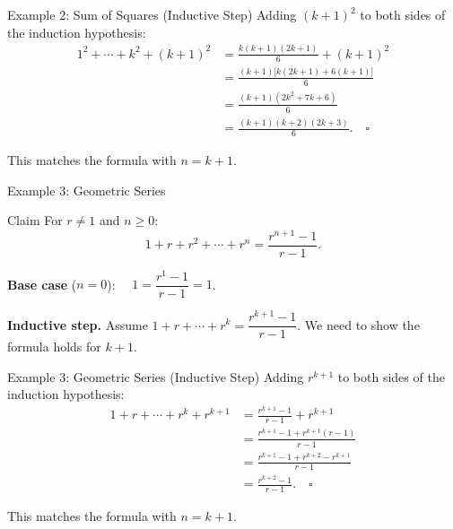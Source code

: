 \documentclass[10pt,aspectratio=169]{beamer}
\begin{document}
\begin{frame}{Example 2: Sum of Squares (Inductive Step)}
  Adding $(k+1)^2$ to both sides of the induction hypothesis:
  \begin{align*}
    1^2 + \cdots + k^2 + (k+1)^2
    &= \frac{k(k+1)(2k+1)}{6} + (k+1)^2 \\[0.4em]
    &= \frac{(k+1)\bigl[k(2k+1) + 6(k+1)\bigr]}{6} \\[0.4em]
    &= \frac{(k+1)(2k^2 + 7k + 6)}{6} \\[0.4em]
    &= \frac{(k+1)(k+2)(2k+3)}{6}. \quad \square
  \end{align*}

  \bigskip
  \begin{center}
    This matches the formula with $n = k+1$.
  \end{center}
\end{frame}

\begin{frame}{Example 3: Geometric Series}
  \begin{block}{Claim}
    For $r \ne 1$ and $n \ge 0$:
    \[
      1 + r + r^2 + \cdots + r^n = \frac{r^{n+1} - 1}{r - 1}.
    \]
  \end{block}

  \bigskip
  \textbf{Base case} ($n = 0$): $\quad 1 = \dfrac{r^1 - 1}{r - 1} = 1$.

  \bigskip
  \textbf{Inductive step.} Assume $1 + r + \cdots + r^k = \dfrac{r^{k+1}-1}{r-1}$.
  We need to show the formula holds for $k+1$.
\end{frame}

\begin{frame}{Example 3: Geometric Series (Inductive Step)}
  Adding $r^{k+1}$ to both sides of the induction hypothesis:
  \begin{align*}
    1 + r + \cdots + r^k + r^{k+1}
    &= \frac{r^{k+1} - 1}{r - 1} + r^{k+1} \\[0.5em]
    &= \frac{r^{k+1} - 1 + r^{k+1}(r - 1)}{r - 1} \\[0.5em]
    &= \frac{r^{k+1} - 1 + r^{k+2} - r^{k+1}}{r - 1} \\[0.5em]
    &= \frac{r^{k+2} - 1}{r - 1}. \quad \square
  \end{align*}

  \bigskip
  \begin{center}
    This matches the formula with $n = k+1$.
  \end{center}
\end{frame}
\end{document}
